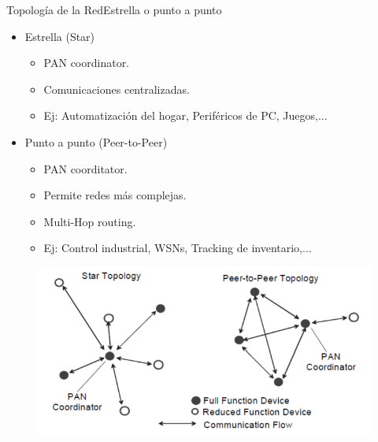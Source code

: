 \documentclass[aspectratio=169, handout]{beamer}
\begin{document}
\begin{frame}{Topología de la Red}{Estrella o punto a punto}

\begin{minipage}[c]{1.0\linewidth}
	\begin{minipage}[c]{0.45\linewidth}
		\begin{itemize}
			\item Estrella (Star)
			\begin{itemize}
				\item PAN coordinator.
				\item Comunicaciones centralizadas.
				\item Ej: Automatización del hogar, Periféricos de PC, Juegos,...
					\end{itemize}
			\vspace{10px}
			\item Punto a punto (Peer-to-Peer)
			\begin{itemize}
				\item PAN coorditator.
				\item Permite redes más complejas.
				\item Multi-Hop routing.
				\item Ej: Control industrial,  WSNs, Tracking de inventario,...
			\end{itemize}
	  	\end{itemize}	
	\end{minipage}
	\hspace{-20px}
	\begin{minipage}[c]{0.7\linewidth}
		\begin{figure}[H]
			{\includegraphics[width=.7\textwidth]{./imagenes/Topology}}
		\end{figure}	  	  	
	\end{minipage}
\end{minipage}
\end{frame}
\end{document}
